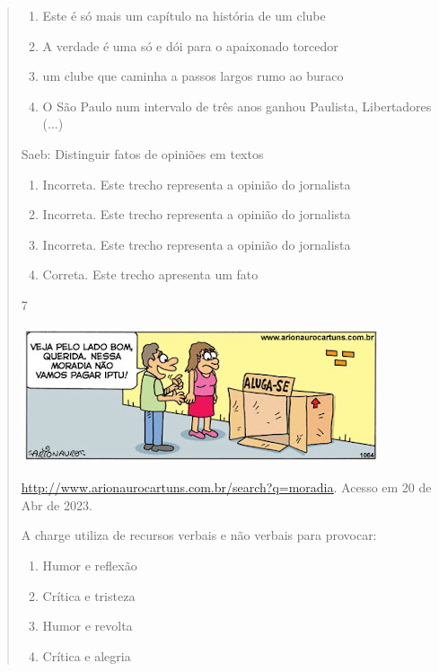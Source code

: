 {\begin{quote}
{\begin{itemize}
\begin{itemize}
\begin{enumerate}

\item
  Este é só mais um capítulo na história de um clube
\item
  A verdade é uma só e dói para o apaixonado torcedor
\item
  um clube que caminha a passos largos rumo ao buraco
\item
  O São Paulo num intervalo de três anos ganhou Paulista, Libertadores
  (...)
\end{enumerate}

Saeb: Distinguir fatos de opiniões em textos

\begin{enumerate}
\def\labelenumi{\arabic{enumi}.}
\item
  Incorreta. Este trecho representa a opinião do jornalista
\item
  Incorreta. Este trecho representa a opinião do jornalista
\item
  Incorreta. Este trecho representa a opinião do jornalista
\item
  Correta. Este trecho apresenta um fato
\end{enumerate}

\num{7}

\includegraphics[width=4.16667in,height=1.57292in]{./imgSAEB_7_POR/media/image17.png}

\href{http://www.arionaurocartuns.com.br/search?q=moradia}{\uline{http://www.arionaurocartuns.com.br/search?q=moradia}}.
Acesso em 20 de Abr de 2023.

A charge utiliza de recursos verbais e não verbais para provocar:

\begin{enumerate}

\item
  Humor e reflexão
\item
  Crítica e tristeza
\item
  Humor e revolta
\item
  Crítica e alegria
\end{enumerate}


\end{itemize}
\end{itemize}}
\end{quote}}
